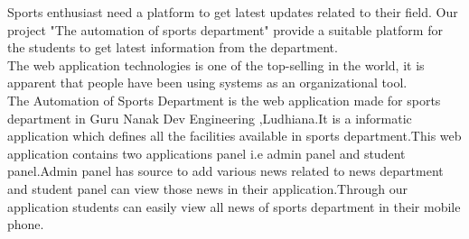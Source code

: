 \begin{Large}
\end{Large}
\vskip 0.1in Sports enthusiast need a platform to get latest updates related to their field. Our project "The automation of sports department" provide a suitable platform for the students to get latest information from the department. \\  

\noindent The web application technologies is one of the top-selling in the world, it is apparent that people have been using systems as an organizational tool.\\

\noindent The Automation of Sports Department is the web application made for sports department in Guru Nanak Dev
Engineering ,Ludhiana.It is a informatic application which defines all the facilities available
in sports department.This web application contains two applications panel i.e admin panel and
student panel.Admin panel has source to add various news related to news department and
student panel can view those news in their application.Through our application students can
easily view all news of sports department in their mobile phone.